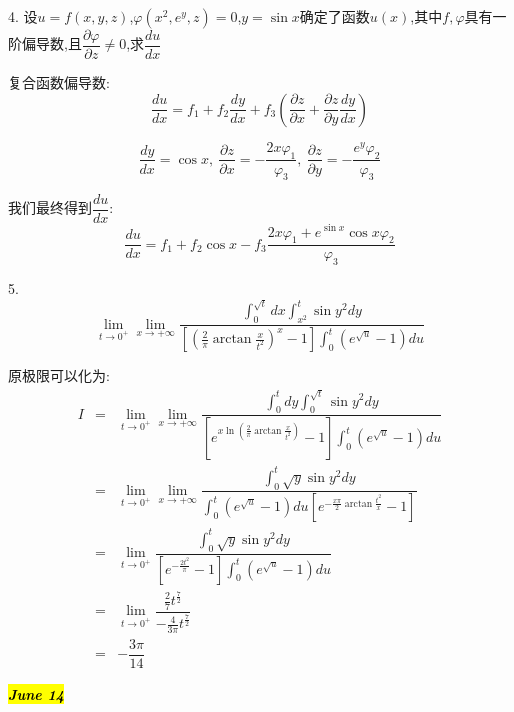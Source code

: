 
4. 设$u=f(x,y,z)$,$\varphi(x^2,e^y,z)=0$,$y=\sin x$确定了函数$u(x)$,其中$f,\varphi$具有一阶偏导数,且$\dfrac{\partial \varphi}{\partial z}\neq 0$,求$\dfrac{du}{dx}$
\begin{solution}
	
	复合函数偏导数: 
	$$\dfrac{du}{dx}=f_{1}+f_{2}\dfrac{dy}{dx}+f_{3}(\dfrac{\partial z}{\partial x}+\dfrac{\partial z}{\partial y}\dfrac{dy}{dx})$$
	
	$$\dfrac{dy}{dx}=\cos x,\ \dfrac{\partial z}{\partial x}=-\dfrac{2x\varphi_{1}}{\varphi_{3}},\ \dfrac{\partial z}{\partial y}=-\dfrac{e^y\varphi_{2}}{\varphi_{3}}$$
	
	我们最终得到$\dfrac{du}{dx}$: 
	$$\dfrac{du}{dx}=f_{1}+f_{2}\cos x-f_{3}\dfrac{2x\varphi_{1}+e^{\sin x}\cos x \varphi_{2}}{\varphi_{3}}$$
\end{solution}


5. $$\lim\limits_{t\rightarrow 0^{+}}\lim\limits_{x\rightarrow+\infty}\dfrac{\int_{0}^{\sqrt{t}}dx\int_{x^2}^{t}\sin y^2dy}{\left[\left( \frac{2}{\pi}\arctan \frac{x}{t^2}\right)^{x}-1\right]\int_{0}^{t}(e^{\sqrt{u}}-1)du }$$
\begin{solution}
	
	原极限可以化为: 
	\begin{eqnarray*}
		I&=&\lim\limits_{t\rightarrow 0^{+}}\lim\limits_{x\rightarrow+\infty}\dfrac{\int_{0}^{t}dy\int_{0}^{\sqrt{t}}\sin y^2dy}{[e^{x\ln(\frac{2}{\pi}\arctan \frac{x}{t^2})}-1]\int_{0}^{t}(e^{\sqrt{u}}-1)du}\\
		&=&\lim\limits_{t\rightarrow 0^{+}}\lim\limits_{x\rightarrow+\infty}\dfrac{\int_{0}^{t}\sqrt{y}\sin y^2dy}{\int_{0}^{t}(e^{\sqrt{u}}-1)du[e^{-\frac{x\pi}{2}\arctan\frac{t^2}{x}}-1]}\\
		&=&\lim\limits_{t\rightarrow 0^{+}}\dfrac{\int_{0}^{t}\sqrt{y}\sin y^2dy}{[e^{-\frac{2t^2}{\pi}}-1]\int_{0}^{t}(e^{\sqrt{u}}-1)du}\\
		&=&\lim\limits_{t\rightarrow 0^{+}}\dfrac{\frac{2}{7}t^{\frac{7}{2}}}{-\frac{4}{3\pi}t^{\frac{7}{2}}}\\
		&=&-\dfrac{3\pi}{14}
	\end{eqnarray*}
\end{solution}


\hl{\textbf{\textit{June 14}}}

